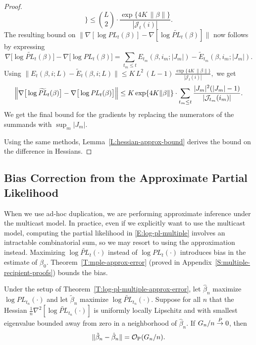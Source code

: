 \documentclass[final]{statsoc}
\begin{document}
\begin{proof}
\[    \Big\}
        \leq
        \binom{L}{2}
        \cdot
        \frac{\exp\{4 K \, \| \beta \|\}}{| \mathcal{J}_t(i) |}.
\]
The resulting bound on
\(
    \|
    \nabla [\log \mathit{PL}_{t}(\beta) ]
    -
    \nabla [\log \widetilde{\mathit{PL}}_{t}(\beta) ]
    \|
\)
now follows by expressing
\[
    \nabla \big[ \log \widetilde{\mathit{PL}}_t(\beta) \big]
    -
    \nabla \big[ \log \mathit{PL}_t(\beta )\big]
        =
        \sum_{t_m \leq t}
            E_{t_m}\!(\beta, i_m; |J_m|)
            -
            \widetilde{E}_{t_m}\!(\beta, i_m; |J_m|).
\]
Using
\(
    \big\| E_{t}(\beta, i; L) - \widetilde{E}_t(\beta, i; L) \big\|
        \leq
        K \, L^2 \, (L - 1)
        \,
        \frac{\exp\{4 K \, \| \beta \|\}}{| \mathcal{J}_t(i) |},
\)
we get
\[
    \Big\|
        \nabla\big[ \log \widetilde{\mathit{PL}}_t( \beta ) \big]
        -
        \nabla\big[ \log {\mathit{PL}}_t( \beta ) \big]
    \Big\| \\
        \leq
            K
            \exp\{4 K \| \beta \|\}
            \cdot
            \sum_{t_m \leq t}
                \frac{|J_m|^2(|J_m| - 1)}{|\mathcal{J}_{t_m}(i_m)|}.
\]
We get the final bound for the gradients by replacing the numerators of the
summands with $\sup_m |J_m|$.

Using the same methods, Lemma~\ref{L:hessian-approx-bound} derives the bound
on the difference in Hessians.
\end{proof}

\subsection{Bias Correction from the Approximate Partial Likelihood}
\label{S:approximation-bias}

When we use ad-hoc duplication, we are performing approximate inference
under the multicast model.  In practice, even if we explicitly want to use the
multicast model, computing the partial likelihood in \eqref{E:log-pl-multiple}
involves an intractable combinatorial sum, so we may resort to using the
approximation instead.  Maximizing $\log \widetilde{\mathit{PL}}_t(\cdot)$
instead of $\log \mathit{PL}_t(\cdot)$ introduces bias in the estimate of
$\beta_0$.  Theorem~\ref{T:mple-approx-error} (proved in Appendix~\ref{S:multiple-recipient-proofs}) bounds the bias.

\begin{theorem}\label{T:mple-approx-error}
    Under the setup of Theorem~\ref{T:log-pl-multiple-approx-error},
    let $\hat \beta_n$ maximize $\log \mathit{PL}_{t_n}(\cdot)$
    and let $\tilde \beta_n$ maximize
    $\log \widetilde{\mathit{PL}}_{t_n}(\cdot)$.
    Suppose for all $n$ that the Hessian
    \(
        \tfrac{1}{n}
        \nabla^2
        [ \log \mathit{\widetilde{PL}}_{t_n}(\cdot)]
    \)
    is uniformly locally Lipschitz and with smallest eigenvalue bounded away from zero
    in a neighborhood of $\hat \beta_n$.
    If $G_n/n \overset{\mathit{P}}{\to} 0$, then
    \[
        \| \tilde \beta_{n} - \hat \beta_{n} \|
            =
            \mathcal{O}_\text{P}(G_n/n).
    \]
\end{theorem}
\end{document}
